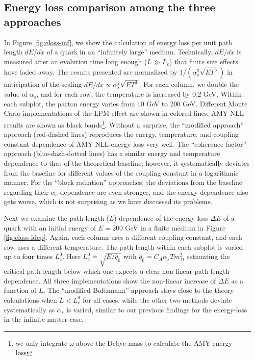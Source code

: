 \subsection{Energy loss comparison among the three approaches}
In Figure \ref{fig:eloss-inf}, we show the calculation of energy loss per unit path length $dE/dx$ of a quark in an ``infinitely large'' medium. 
Technically, $dE/dx$ is measured after an evolution time long enough ($L\gg L_c$) that finite size effects have faded away.
The results presented are normalized by $1/(\alpha_s^2 \sqrt{ET^3})$ in anticipation of the scaling $dE/dx \propto \alpha_s^2 \sqrt{ET^3}$.
For each column, we double the value of $\alpha_s$, and for each row, the temperature is increased by $0.2$ GeV. 
Within each subplot, the parton energy varies from $10$ GeV to $200$ GeV.
Different Monte Carlo implementations of the LPM effect are shown in colored lines, AMY NLL results are shown as black bands\footnote{\singlespacing we only integrate $\omega$ above the Debye mass to calculate the AMY energy loss}. 
Without a surprise, the ``modified approach'' approach (red-dashed lines) reproduces the energy, temperature, and coupling constant dependence of AMY NLL energy loss very well.
The ``coherence factor'' approach (blue-dash-dotted lines) has a similar energy and temperature dependence to that of the theoretical baseline; however, it systematically deviates from the baseline for different values of the coupling constant in a logarithmic manner.
For the ``block radiation'' approaches, the deviations from the baseline regarding their $\alpha_s$-dependence are even stronger, and the energy dependence also gets worse, which is not surprising as we have discussed its problems.

Next we examine the path-length ($L$) dependence of the energy loss $\Delta E$ of a quark with an initial energy of $E = 200$ GeV in a finite medium in Figure \ref{fig:eloss-ldep}.
Again, each column uses a different coupling constant, and each row uses a different temperature. 
The path length within each subplot is varied up to four times $L_c^0$.
Here $L_c^0 = \sqrt{E/\hat{q}_0}$ with $\hat{q}_0 = C_A \alpha_s T m_D^2$ estimating the critical path length below which one expects a clear non-linear path-length dependence.
All three implementations show the non-linear increase of $\Delta E$ as a function of $L$.
The ``modified Boltzmann'' approach stays close to the theory calculations when $L<L_c^0$ for all cases, while the other two methods deviate systematically as $\alpha_s$ is varied, similar to our previous findings for the energy-loss in the infinite matter case.

